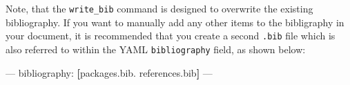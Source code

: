 \documentclass[]{book}
\newenvironment{Shaded}{\begin{snugshade}}{\end{snugshade}}
\newcommand{\KeywordTok}[1]{\textcolor[rgb]{0.13,0.29,0.53}{\textbf{#1}}}
\newcommand{\OtherTok}[1]{\textcolor[rgb]{0.56,0.35,0.01}{#1}}
\newcommand{\FunctionTok}[1]{\textcolor[rgb]{0.00,0.00,0.00}{#1}}
\newcommand{\AttributeTok}[1]{\textcolor[rgb]{0.77,0.63,0.00}{#1}}
\newcommand{\NormalTok}[1]{#1}
\begin{document}
Note, that the \texttt{write\_bib} command is designed to overwrite the
existing bibliography. If you want to manually add any other items to
the bibligraphy in your document, it is recommended that you create a
second \texttt{.bib} file which is also referred to within the YAML
\texttt{bibliography} field, as shown below:

\begin{Shaded}
\begin{Highlighting}[]
\OtherTok{---}
\FunctionTok{bibliography:}\AttributeTok{ }\KeywordTok{[}\NormalTok{packages.bib. references.bib}\KeywordTok{]}
\OtherTok{---}
\end{Highlighting}
\end{Shaded}


\end{document}
